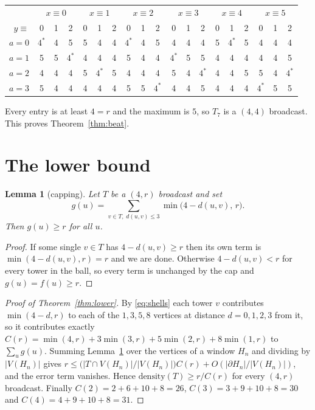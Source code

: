 \documentclass[11pt]{amsart}
\newtheorem{lemma}[theorem]{Lemma}
\theoremstyle{definition}
\begin{document}
\smallskip
\noindent
\footnotesize
\setlength{\tabcolsep}{3pt}
\begin{tabular}{r|ccc|ccc|ccc|ccc|ccc|ccc}
 & \multicolumn{3}{c|}{$x\equiv 0$} & \multicolumn{3}{c|}{$x\equiv 1$}
 & \multicolumn{3}{c|}{$x\equiv 2$} & \multicolumn{3}{c|}{$x\equiv 3$}
 & \multicolumn{3}{c|}{$x\equiv 4$} & \multicolumn{3}{c}{$x\equiv 5$}\\
$y\equiv$ & 0 & 1 & 2 & 0 & 1 & 2 & 0 & 1 & 2 & 0 & 1 & 2 & 0 & 1 & 2 & 0 & 1 & 2\\
\hline
$a=0$ & $4^{\ast}$ & 4 & 5 & 5 & 4 & 4 & $4^{\ast}$ & 4 & 5 & 4 & 4 & 4 & 5 & $4^{\ast}$ & 5 & 4 & 4 & 4\\
$a=1$ & 5 & 5 & $4^{\ast}$ & 4 & 4 & 4 & 5 & 4 & 4 & $4^{\ast}$ & 5 & 5 & 4 & 4 & 4 & 4 & 4 & 5\\
$a=2$ & 4 & 4 & 4 & 5 & $4^{\ast}$ & 5 & 4 & 4 & 4 & 5 & 4 & $4^{\ast}$ & 4 & 4 & 5 & 5 & 4 & $4^{\ast}$\\
$a=3$ & 5 & 4 & 4 & 4 & 4 & 4 & 5 & 5 & $4^{\ast}$ & 4 & 4 & 5 & 4 & 4 & 4 & $4^{\ast}$ & 5 & 5
\end{tabular}
\normalsize
\setlength{\tabcolsep}{6pt}
\smallskip

\noindent
Every entry is at least $4=r$ and the maximum is $5$, so $T_7$ is a $(4,4)$ broadcast. This
proves Theorem~\ref{thm:beat}.

\section{The lower bound}\label{sec:lower}

\begin{lemma}[capping]\label{lem:cap}
Let $T$ be a $(4,r)$ broadcast and set
\[
  g(u)=\sum_{v\in T,\;d(u,v)\leq 3}\min\bigl(4-d(u,v),\,r\bigr).
\]
Then $g(u)\geq r$ for all $u$.
\end{lemma}

\begin{proof}
If some single $v\in T$ has $4-d(u,v)\geq r$ then its own term is
$\min(4-d(u,v),r)=r$ and we are done. Otherwise $4-d(u,v)<r$ for every tower in the ball, so
every term is unchanged by the cap and $g(u)=f(u)\geq r$.
\end{proof}

\begin{proof}[Proof of Theorem~\ref{thm:lower}]
By \eqref{eq:shells} each tower $v$ contributes $\min(4-d,r)$ to each of the $1,3,5,8$ vertices
at distance $d=0,1,2,3$ from it, so it contributes exactly
$C(r)=\min(4,r)+3\min(3,r)+5\min(2,r)+8\min(1,r)$ to $\sum_u g(u)$. Summing
Lemma~\ref{lem:cap} over the vertices of a window $H_n$ and dividing by $|V(H_n)|$ gives
$r\leq\bigl(|T\cap V(H_n)|/|V(H_n)|\bigr)C(r)+O(|\partial H_n|/|V(H_n)|)$, and the error term
vanishes. Hence $\text{density}(T)\geq r/C(r)$ for every $(4,r)$ broadcast. Finally
$C(2)=2+6+10+8=26$, $C(3)=3+9+10+8=30$ and $C(4)=4+9+10+8=31$.
\end{proof}
\end{document}
